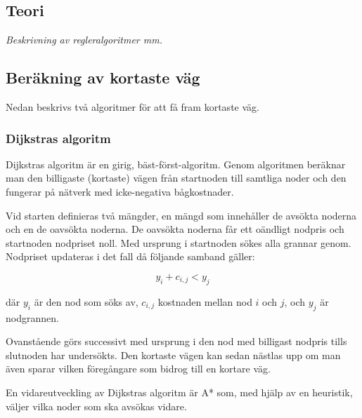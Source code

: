 \documentclass[11pt]{article}
\begin{document}
\begin{flushleft}
\section{Teori}
\textit{Beskrivning av regleralgoritmer mm.}

\subsection{Beräkning av kortaste väg}
Nedan beskrivs två algoritmer för att få fram kortaste väg.

\subsubsection{Dijkstras algoritm}
Dijkstras algoritm är en girig, bäst-först-algoritm. Genom algoritmen beräknar man den billigaste (kortaste) vägen från startnoden till samtliga noder och den fungerar på nätverk med icke-negativa bågkostnader. 

Vid starten definieras två mängder, en mängd som innehåller de avsökta noderna och en de oavsökta noderna. De oavsökta noderna får ett oändligt nodpris och startnoden nodpriset noll. Med ursprung i startnoden sökes alla grannar genom. Nodpriset updateras i det fall då följande samband gäller:

\begin{displaymath}
	y_i + c_{i,j} < y_j
\end{displaymath}

där \begin{math} y_i \end{math} är den nod som söks av, \begin{math} c_{i,j} \end{math} kostnaden mellan nod \begin{math} i \end{math} och \begin{math} j \end{math}, och \begin{math} y_j \end{math} är nodgrannen.

Ovanstående görs successivt med ursprung i den nod med billigast nodpris tills slutnoden har undersökts. Den kortaste vägen kan sedan nästlas upp om man även sparar vilken föregångare som bidrog till en kortare väg. 

En vidareutveckling av Dijkstras algoritm är A* som, med hjälp av en heuristik, väljer vilka noder som ska avsökas vidare.


\end{flushleft}
\end{document}
